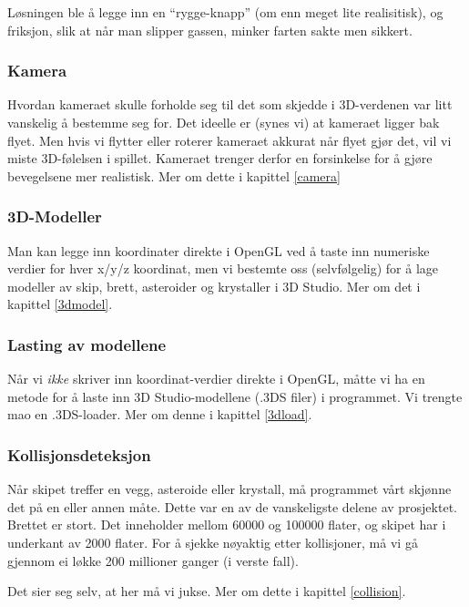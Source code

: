 \documentclass[11pt, dvips]{report}
\begin{document}
Løsningen ble å legge inn en ``rygge-knapp'' (om enn meget lite
realisitisk), og friksjon, slik at når man slipper gassen, minker
farten sakte men sikkert.

\subsubsection{Kamera}

Hvordan kameraet skulle forholde seg til det som skjedde i 3D-verdenen
var litt vanskelig å bestemme seg for. Det ideelle er (synes vi) at
kameraet ligger bak flyet. Men hvis vi flytter eller roterer kameraet
akkurat når flyet gjør det, vil vi miste 3D-følelsen i spillet.
Kameraet trenger derfor en forsinkelse for å gjøre bevegelsene mer
realistisk. Mer om dette i kapittel \ref{camera}

\subsubsection{3D-Modeller}

Man kan legge inn koordinater direkte i OpenGL ved å taste inn
numeriske verdier for hver x/y/z koordinat, men vi bestemte oss
(selvfølgelig) for å lage modeller av skip, brett, asteroider og
krystaller i 3D Studio. Mer om det i kapittel \ref{3dmodel}.

\subsubsection{Lasting av modellene}

Når vi \emph{ikke} skriver inn koordinat-verdier direkte i OpenGL,
måtte vi ha en metode for å laste inn 3D Studio-modellene (.3DS filer)
i programmet. Vi trengte mao en .3DS-loader. Mer om denne i kapittel
\ref{3dload}.

\subsubsection{Kollisjonsdeteksjon}

Når skipet treffer en vegg, asteroide eller krystall, må programmet
vårt skjønne det på en eller annen måte. Dette var en av de
vanskeligste delene av prosjektet. Brettet er stort. Det inneholder
mellom 60000 og 100000 flater, og skipet har i underkant av 2000
flater. For å sjekke nøyaktig etter kollisjoner, må vi gå gjennom ei
løkke 200 millioner ganger (i verste fall).

Det sier seg selv, at her må vi jukse. Mer om dette i kapittel
\ref{collision}.
\end{document}
